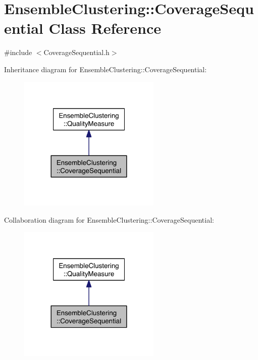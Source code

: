\hypertarget{class_ensemble_clustering_1_1_coverage_sequential}{\section{Ensemble\-Clustering\-:\-:Coverage\-Sequential Class Reference}
\label{class_ensemble_clustering_1_1_coverage_sequential}
}


{\ttfamily \#include $<$Coverage\-Sequential.\-h$>$}



Inheritance diagram for Ensemble\-Clustering\-:\-:Coverage\-Sequential\-:
\nopagebreak
\begin{figure}[H]
\begin{center}
\leavevmode
\includegraphics[width=192pt]{class_ensemble_clustering_1_1_coverage_sequential__inherit__graph}
\end{center}
\end{figure}


Collaboration diagram for Ensemble\-Clustering\-:\-:Coverage\-Sequential\-:
\nopagebreak
\begin{figure}[H]
\begin{center}
\leavevmode
\includegraphics[width=192pt]{class_ensemble_clustering_1_1_coverage_sequential__coll__graph}
\end{center}
\end{figure}
